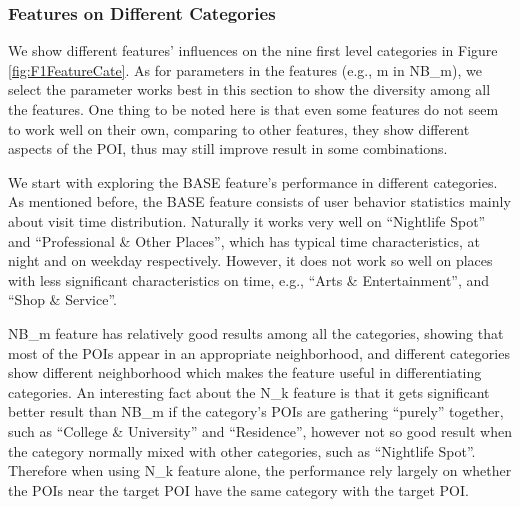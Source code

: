 \subsubsection{Features on Different Categories}
\label{exp1}
We show different features' influences on the nine first level categories
in Figure \ref{fig:F1FeatureCate}. As for parameters in the features (e.g.,
m in NB\_m), we select the parameter works best in this section
to show the diversity among all the features. One thing to be noted
here is that even some features do not seem
to work well on their own, comparing to other features, they show
different aspects of the POI, thus may still improve result in some
combinations.

We start with exploring the BASE feature's performance in different categories.
As mentioned before, the BASE feature consists of user behavior statistics
mainly about visit time distribution. Naturally it works very well on ``Nightlife Spot''
and ``Professional \& Other Places'', which has typical time characteristics,
at night and on weekday respectively. However, it does not work so well on places
with less significant characteristics on time, e.g., ``Arts \& Entertainment'', and ``Shop \& Service''.

NB\_m feature has relatively good results among all the categories,
showing that most of the POIs appear in an appropriate neighborhood,
and different categories show different neighborhood which makes the
feature useful in differentiating categories. An interesting fact about the
N\_k feature is that it gets significant better result than NB\_m if
the category's POIs are gathering ``purely'' together, such as
``College \& University'' and ``Residence'', however not so good result
when the category normally mixed with other categories, such as
``Nightlife Spot''. Therefore when using N\_k feature alone, the
performance rely largely on whether the POIs near the target POI
have the same category with the target POI. 

